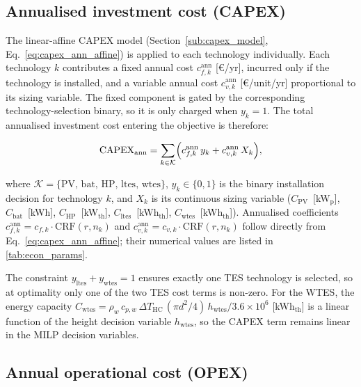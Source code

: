 \documentclass[11pt,a4paper]{report}
\begin{document}
\subsection{Annualised investment cost (CAPEX)}

The linear-affine CAPEX model (Section~\ref{sub:capex_model},
Eq.~\eqref{eq:capex_ann_affine}) is applied to each technology individually.
Each technology $k$ contributes a fixed annual cost $c_{f,k}^\mathrm{ann}$
[\euro/yr], incurred only if the technology is installed, and a variable annual
cost $c_{v,k}^\mathrm{ann}$ [\euro/unit/yr] proportional to its sizing variable.
The fixed component is gated by the corresponding technology-selection binary,
so it is only charged when $y_k = 1$.
The total annualised investment cost entering the objective is therefore:

\begin{equation}
    \mathrm{CAPEX}_\mathrm{ann}
    = \sum_{k \in \mathcal{K}}
      \Bigl( c_{f,k}^\mathrm{ann}\,y_k + c_{v,k}^\mathrm{ann}\,X_k \Bigr),
    \label{eq:capex_ann}
\end{equation}

\noindent where $\mathcal{K} = \{\mathrm{PV},\,\mathrm{bat},\,\mathrm{HP},\,\mathrm{ltes},\,\mathrm{wtes}\}$,
$y_k \in \{0,1\}$ is the binary installation decision for technology $k$,
and $X_k$ is its continuous sizing variable
($C_\mathrm{PV}$~[kW$_\mathrm{p}$], $C_\mathrm{bat}$~[kWh], $C_\mathrm{HP}$~[kW$_\mathrm{th}$],
$C_\mathrm{ltes}$~[kWh$_\mathrm{th}$], $C_\mathrm{wtes}$~[kWh$_\mathrm{th}$]).
Annualised coefficients $c_{f,k}^\mathrm{ann} = c_{f,k} \cdot \mathrm{CRF}(r,n_k)$
and $c_{v,k}^\mathrm{ann} = c_{v,k} \cdot \mathrm{CRF}(r,n_k)$ follow directly from
Eq.~\eqref{eq:capex_ann_affine}; their numerical values are listed in
\autoref{tab:econ_params}.

The constraint $y_\mathrm{ltes} + y_\mathrm{wtes} = 1$ ensures exactly one TES
technology is selected, so at optimality only one of the two TES cost terms
is non-zero.
For the WTES, the energy capacity $C_\mathrm{wtes} = \rho_w\,c_{p,w}\,\Delta T_\mathrm{HC}\,
({\pi d^2}/{4})\,h_\mathrm{wtes} / 3.6{\times}10^6$ [kWh$_\mathrm{th}$]
is a linear function of the height decision variable $h_\mathrm{wtes}$, so the
CAPEX term remains linear in the MILP decision variables.

\subsection{Annual operational cost (OPEX)}
\label{subsec:opex}
\end{document}
